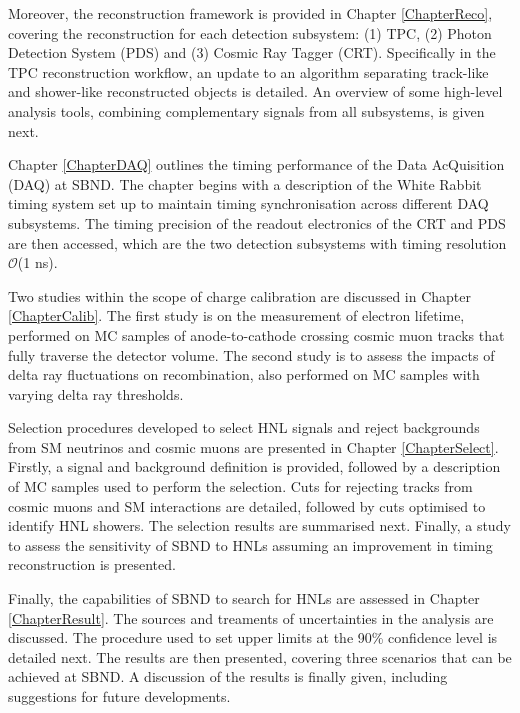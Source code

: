 Moreover, the reconstruction framework is provided in Chapter \ref{ChapterReco}, covering the reconstruction for each detection subsystem: (1) TPC, (2) Photon Detection System (PDS) and (3) Cosmic Ray Tagger (CRT).
Specifically in the TPC reconstruction workflow, an update to an algorithm separating track-like and shower-like reconstructed objects is detailed.
An overview of some high-level analysis tools, combining complementary signals from all subsystems, is given next. 
                                                                                                                       
Chapter \ref{ChapterDAQ} outlines the timing performance of the Data AcQuisition (DAQ) at SBND.
The chapter begins with a description of the White Rabbit timing system set up to maintain timing synchronisation across different DAQ subsystems.
The timing precision of the readout electronics of the CRT and PDS are then accessed, which are the two detection subsystems with timing resolution $\mathcal{O}$(1 ns).

Two studies within the scope of charge calibration are discussed in Chapter \ref{ChapterCalib}.
The first study is on the measurement of electron lifetime, performed on MC samples of anode-to-cathode crossing cosmic muon tracks that fully traverse the detector volume.
The second study is to assess the impacts of delta ray fluctuations on recombination, also performed on MC samples with varying delta ray thresholds.  
                                                                                                                                            
Selection procedures developed to select HNL signals and reject backgrounds from SM neutrinos and cosmic muons are presented in Chapter \ref{ChapterSelect}.
Firstly, a signal and background definition is provided, followed by a description of MC samples used to perform the selection.
Cuts for rejecting tracks from cosmic muons and SM interactions are detailed, followed by cuts optimised to identify HNL showers.
The selection results are summarised next.
Finally, a study to assess the sensitivity of SBND to HNLs assuming an improvement in timing reconstruction is presented.
                                                                                                                                                     
Finally, the capabilities of SBND to search for HNLs are assessed in Chapter \ref{ChapterResult}.
The sources and treaments of uncertainties in the analysis are discussed.
The procedure used to set upper limits at the 90\% confidence level is detailed next. 
The results are then presented, covering three scenarios that can be achieved at SBND.
A discussion of the results is finally given, including suggestions for future developments.                        

